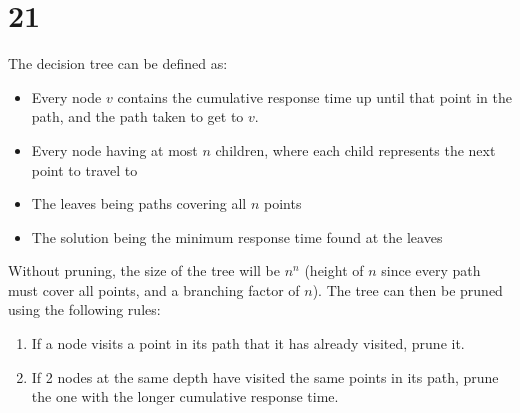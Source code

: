 \documentclass[letterpaper,notitlepage,twoside]{article}
\begin{document}
\section*{21}
The decision tree can be defined as: 
\begin{itemize}
\item Every node $v$ contains the cumulative response time up until that point in the path, and the path taken to get to $v$. 
\item Every node having at most $n$ children, where each child represents the next point to travel to
\item The leaves being paths covering all $n$ points
\item The solution being the minimum response time found at the leaves
\end{itemize}
Without pruning, the size of the tree will be $n^n$ (height of $n$ since every path must cover all points, and a branching factor of $n$). The tree can then be pruned using the following rules:
\begin{enumerate}
\item If a node visits a point in its path that it has already visited, prune it.
\item If 2 nodes at the same depth have visited the same points in its path, prune the one with the longer cumulative response time.
\end{enumerate}
\end{document}
